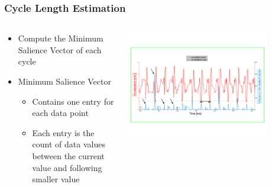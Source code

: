 \documentclass{beamer}
\begin{document}
\begin{frame}
  \frametitle{Cycle Length Estimation}
  \begin{columns}
  \begin{column}{.5\textwidth}
  \begin{itemize}
  	\item Compute the Minimum Salience Vector of each cycle
  	\linebreak
  	\item Minimum Salience Vector
  		\begin{itemize}
  			\item Contains one entry for each data point
  			\item Each entry is the count of data values between the current value and following smaller value
  		\end{itemize}
  \end{itemize}
  \end{column}
    \begin{column}{0.7\textwidth}
   \includegraphics[width=0.8\textwidth]{Illustrations/svector2.png}
       \\
  \end{column}
  \end{columns}
\end{frame}
\end{document}
